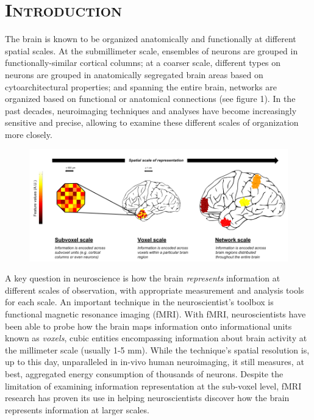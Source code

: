 \documentclass[jou,12pt,a4paper]{apa6}
\begin{document}

\maketitle

\section{\Large \textsc{Introduction}}
\noindent The brain is known to be organized anatomically and functionally at different spatial scales. At the submillimeter scale, ensembles of neurons are grouped in functionally-similar cortical columns; at a coarser scale, different types on neurons are grouped in anatomically segregated brain areas based on cytoarchitectural properties; and spanning the entire brain, networks are organized based on functional or anatomical connections (see figure 1). In the past decades, neuroimaging techniques and analyses have become increasingly sensitive and precise, allowing to examine these different scales of organization more closely.  

\begin{figure}[ht]
\centering
\includegraphics[width=\textwidth]{spatial_dist4}
\end{figure}

A key question in neuroscience is how the brain \emph{represents} information at different scales of observation, with appropriate measurement and analysis tools for each scale. An important technique in the neuroscientist's toolbox is functional magnetic resonance imaging (fMRI). With fMRI, neuroscientists have been able to probe how the brain maps information onto informational units known as \emph{voxels}, cubic entities encompassing information about brain activity at the millimeter scale (usually 1-5 mm). While the technique's spatial resolution is, up to this day, unparalleled in in-vivo human neuroimaging, it still measures, at best, aggregated energy consumption of thousands of neurons. Despite the limitation of examining information representation at the sub-voxel level, fMRI research has proven its use in helping neuroscientists discover how the brain represents information at larger scales.
\end{document}
